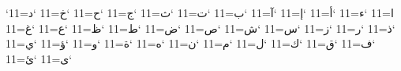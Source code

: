 \catcode`ا=11
\catcode`ء=11
\catcode`أ=11
\catcode`إ=11
\catcode`آ=11
\catcode`ب=11
\catcode`ت=11
\catcode`ث=11
\catcode`ج=11
\catcode`ح=11
\catcode`خ=11
\catcode`د=11
\catcode`ذ=11
\catcode`ر=11
\catcode`ز=11
\catcode`س=11
\catcode`ش=11
\catcode`ص=11
\catcode`ض=11
\catcode`ط=11
\catcode`ظ=11
\catcode`ع=11
\catcode`غ=11
\catcode`ف=11
\catcode`ق=11
\catcode`ك=11
\catcode`ل=11
\catcode`م=11
\catcode`ن=11
\catcode`ه=11
\catcode`ة=11
\catcode`و=11
\catcode`ؤ=11
\catcode`ي=11
\catcode`ى=11
\catcode`ئ=11
